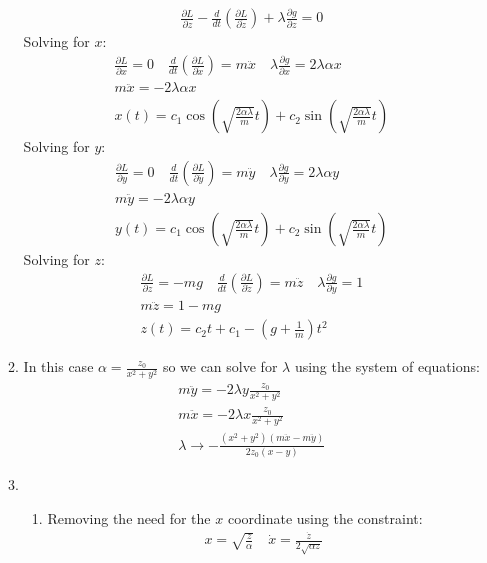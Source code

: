 \documentclass[12pt]{article}
\newcommand{\p}[2]{\frac{\partial #1}{\partial #2}}
\newcommand{\der}[2]{\frac{d #1}{d #2}}
\begin{document}
\begin{enumerate}
\begin{enumerate}
\begin{gather}
                \p{L}{z}-\der{}{t}\left(\p{L}{\dot{z}}\right)+\lambda\p{g}{z}=0
            \end{gather}
            Solving for $x$:
            \begin{gather}
                \p{L}{x}=0\quad\der{}{t}\left(\p{L}{\dot{x}}\right)=m\ddot{x}\quad\lambda\p{g}{x}=2\lambda\alpha x\\
                m\ddot{x}=-2\lambda\alpha x\\
                x(t)=c_1\cos\left(\sqrt{\frac{2\alpha\lambda}{m}}t\right)+c_2\sin\left(\sqrt{\frac{2\alpha\lambda}{m}}t\right)
            \end{gather}
            Solving for $y$:
            \begin{gather}
                \p{L}{y}=0\quad\der{}{t}\left(\p{L}{\dot{y}}\right)=m\ddot{y}\quad\lambda\p{g}{y}=2\lambda\alpha y\\
                m\ddot{y}=-2\lambda\alpha y\\
                y(t)=c_1\cos\left(\sqrt{\frac{2\alpha\lambda}{m}}t\right)+c_2\sin\left(\sqrt{\frac{2\alpha\lambda}{m}}t\right)
            \end{gather}
            Solving for $z$:
            \begin{gather}
                \p{L}{z}=-mg\quad\der{}{t}\left(\p{L}{\dot{z}}\right)=m\ddot{z}\quad\lambda\p{g}{y}=1\\
                m\ddot{z}=1-mg\\
                z(t)=c_2 t+c_1-\left(g+\frac{1}{m}\right)t^2
            \end{gather}
            \item In this case $\alpha=\frac{z_0}{x^2+y^2}$ so we can solve for $\lambda$ using the system of equations:
            \begin{gather}
                m\ddot{y}=-2\lambda y\frac{z_0}{x^2+y^2}\\
                m\ddot{x}=-2\lambda x\frac{z_0}{x^2+y^2}\\
                \lambda \to -\frac{\left(x^2+y^2\right) \left(m \ddot{x}-m \ddot{y}\right)}{2 z_0 (x-y)}
            \end{gather}
            \item
            \begin{enumerate}
                \item Removing the need for the $x$ coordinate using the constraint:
                \begin{gather}
                    x=\sqrt{\frac{z}{\alpha}}\quad\dot{x}=\frac{\dot{z}}{2\sqrt{\alpha z}}\\

\end{gather}
\end{enumerate}
\end{enumerate}
\end{enumerate}
\end{document}
